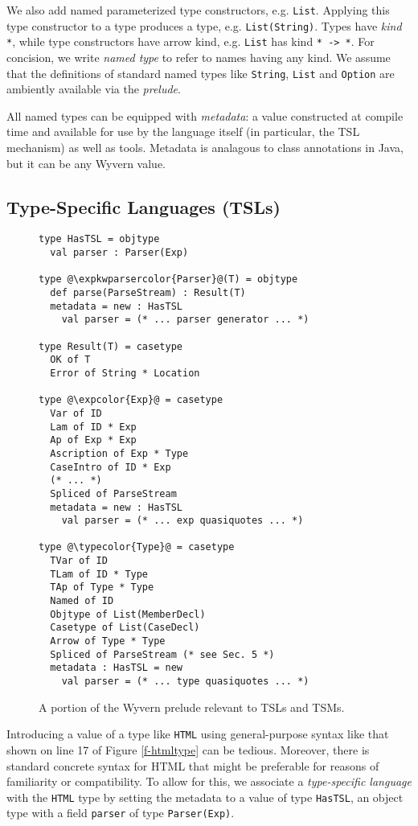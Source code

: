 \documentclass{sig-alternate}
\newcommand{\expkwparsercolor}[1]{\textcolor[HTML]{336699}{#1}}
\newcommand{\expcolor}[1]{\textcolor[HTML]{FF0033}{#1}}
\newcommand{\typecolor}[1]{\textcolor[HTML]{660066}{#1}}
\newcommand{\mycaption}[1]{\vspace{-4px}\caption{#1}\vspace{-2px}}
\begin{document}
We also add  named parameterized type constructors, e.g. \verb|List|. Applying this type constructor to a type produces a type, e.g. \verb|List(String)|. Types have \emph{kind} \verb|*|, while {type constructors} have arrow kind, e.g. \verb|List| has kind \verb|* -> *|. For concision, we write \emph{named type} to refer to names having any kind. 
We assume that the definitions of standard named types like \verb|String|, \verb|List| and \verb|Option| are ambiently available via the \emph{prelude}. 

All named types can be equipped with \emph{metadata}: a value constructed at compile time and available for use by the language itself (in particular, the TSL mechanism) as well as tools. Metadata is analagous to class annotations in Java, but it can be any Wyvern value. %

\subsection{Type-Specific Languages (TSLs)}


\begin{figure}[t!]
\begin{lstlisting}[style=wyvern]
type HasTSL = objtype
  val parser : Parser(Exp)

type @\expkwparsercolor{Parser}@(T) = objtype
  def parse(ParseStream) : Result(T)
  metadata = new : HasTSL
    val parser = (* ... parser generator ... *)

type Result(T) = casetype
  OK of T
  Error of String * Location

type @\expcolor{Exp}@ = casetype
  Var of ID
  Lam of ID * Exp
  Ap of Exp * Exp
  Ascription of Exp * Type
  CaseIntro of ID * Exp
  (* ... *)
  Spliced of ParseStream
  metadata = new : HasTSL
    val parser = (* ... exp quasiquotes ... *)

type @\typecolor{Type}@ = casetype
  TVar of ID
  TLam of ID * Type
  TAp of Type * Type
  Named of ID
  Objtype of List(MemberDecl)
  Casetype of List(CaseDecl)
  Arrow of Type * Type
  Spliced of ParseStream (* see Sec. 5 *)
  metadata : HasTSL = new
    val parser = (* ... type quasiquotes ... *)
\end{lstlisting}
\mycaption{A portion of the Wyvern prelude relevant to TSLs and TSMs.}
\label{exp-prelude}
\end{figure}

Introducing a value of a type like \verb|HTML| using general-purpose syntax like that shown on line 17 of Figure \ref{f-htmltype} can be tedious. Moreover, there is standard concrete syntax for HTML that might be preferable for reasons of familiarity or compatibility. To allow for this, we associate a \emph{type-specific language} with the \verb|HTML| type by setting the metadata to a value of type \verb|HasTSL|, an object type with a field \verb|parser| of type \verb|Parser(Exp)|. 
\end{document}
